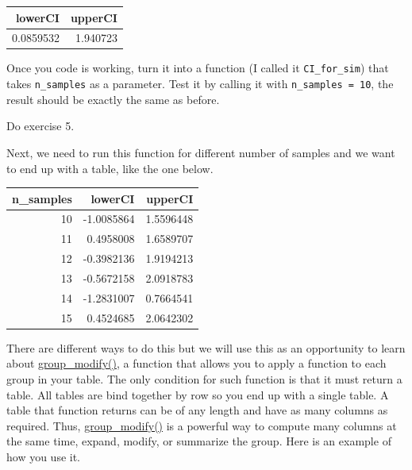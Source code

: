\documentclass[
]{book}
\begin{document}
\begin{tabular}{r|r}
\hline
lowerCI & upperCI\\
\hline
0.0859532 & 1.940723\\
\hline
\end{tabular}

Once you code is working, turn it into a function (I called it \texttt{CI\_for\_sim}) that takes \texttt{n\_samples} as a parameter. Test it by calling it with \texttt{n\_samples\ =\ 10}, the result should be exactly the same as before.

Do exercise 5.

Next, we need to run this function for different number of samples and we want to end up with a table, like the one below.

\begin{tabular}{r|r|r}
\hline
n\_samples & lowerCI & upperCI\\
\hline
10 & -1.0085864 & 1.5596448\\
\hline
11 & 0.4958008 & 1.6589707\\
\hline
12 & -0.3982136 & 1.9194213\\
\hline
13 & -0.5672158 & 2.0918783\\
\hline
14 & -1.2831007 & 0.7664541\\
\hline
15 & 0.4524685 & 2.0642302\\
\hline
\end{tabular}

There are different ways to do this but we will use this as an opportunity to learn about \href{https://dplyr.tidyverse.org/reference/group_map.html}{group\_modify()}, a function that allows you to apply a function to each group in your table. The only condition for such function is that it must return a table. All tables are bind together by row so you end up with a single table. A table that function returns can be of any length and have as many columns as required. Thus, \href{https://dplyr.tidyverse.org/reference/group_map.html}{group\_modify()} is a powerful way to compute many columns at the same time, expand, modify, or summarize the group. Here is an example of how you use it.
\end{document}
